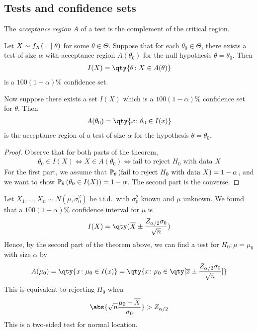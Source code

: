 \subsection{Tests and confidence sets}
\begin{definition}
	The \textit{acceptance region} $A$ of a test is the complement of the critical region.
\end{definition}
\begin{theorem}
	Let $X \sim f_X({}\cdot{}\mid\theta)$ for some $\theta \in \Theta$.
	Suppose that for each $\theta_0 \in \Theta$, there exists a test of size $\alpha$ with acceptance region $A(\theta_0)$ for the  null hypothesis $\theta = \theta_0$.
	Then
	\begin{align*}
		I(X) = \qty{\theta \colon X \in A(\theta)}
	\end{align*}
	is a $100(1-\alpha)\%$ confidence set.

	Now suppose there exists a set $I(X)$ which is a $100(1-\alpha)\%$ confidence set for $\theta$.
	Then
	\begin{align*}
		A(\theta_0) = \qty{x \colon \theta_0 \in I(x)}
	\end{align*}
	is the acceptance region of a test of size $\alpha$ for the hypothesis $\theta = \theta_0$.
\end{theorem}
\begin{proof}
	Observe that for both parts of the theorem,
	\begin{align*}
		\theta_0 \in I(X) \iff X \in A(\theta_0) \iff \text{fail to reject } H_0 \text{ with data } X
	\end{align*}
	For the first part, we assume that $\mathbb{P}_{\theta}\left({\text{fail to reject } H_0 \text{ with data } X}\right) = 1 - \alpha$, and we want to show $\mathbb{P}_{\theta}\left({\theta_0 \in I(X)}\right) = 1 - \alpha$.
	The second part is the converse.
\end{proof}
\begin{example}
	Let $X_1, \dots, X_n \sim N(\mu, \sigma_0^2)$ be i.i.d.\ with $\sigma_0^2$ known and $\mu$ unknown.
	We found that a $100(1-\alpha)\%$ confidence interval for $\mu$ is
	\begin{align*}
		I(X) = \qty(\overline X \pm \frac{Z_{\alpha/2}\sigma_0}{\sqrt{n}})
	\end{align*}
	Hence, by the second part of the theorem above, we can find a test for $H_0 \colon \mu = \mu_0$ with size $\alpha$ by
	\begin{align*}
		A(\mu_0) = \qty{ x \colon \mu_0 \in I(x) } = \qty{ x \colon \mu_0 \in \qty[\overline x \pm \frac{Z_{\alpha/2} \sigma_0}{\sqrt{n}}] }
	\end{align*}
	This is equivalent to rejecting $H_0$ when
	\begin{align*}
		\abs{\sqrt{n} \frac{\mu_0 - \overline X}{\sigma_0}} > Z_{\alpha/2}
	\end{align*}
	This is a two-sided test for normal location.
\end{example}
